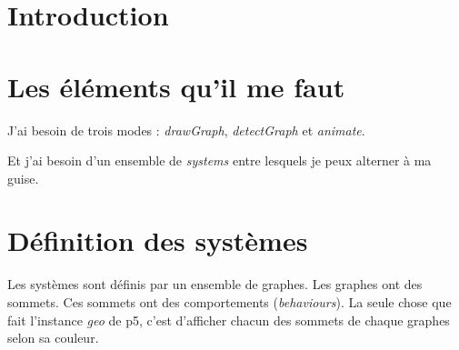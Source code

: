 
\section{Introduction}

\section{Les éléments qu'il me faut}
J'ai besoin de trois modes : \textit{drawGraph}, \textit{detectGraph} et \textit{animate}.

Et j'ai besoin d'un ensemble de \textit{systems} entre lesquels je peux alterner à ma guise.

\section{Définition des systèmes}

Les systèmes sont définis par un ensemble de graphes. Les graphes ont des sommets. Ces sommets ont des comportements (\textit{behaviours}). La seule chose que fait l'instance \textit{geo} de p5, c'est d'afficher chacun des sommets de chaque graphes selon sa couleur.